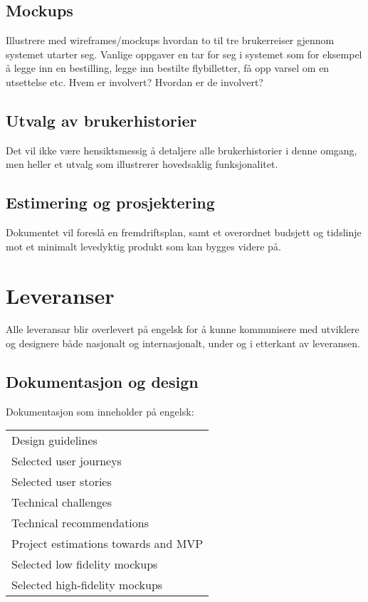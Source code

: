 \subsection{Mockups}
Illustrere med wireframes/mockups hvordan to til tre brukerreiser gjennom systemet utarter seg. Vanlige oppgaver en tar for seg i systemet som for eksempel å legge inn en bestilling, legge inn bestilte flybilletter, få opp varsel om en utsettelse etc. Hvem er involvert? Hvordan er de involvert?

\subsection{Utvalg av brukerhistorier}
Det vil ikke være hensiktsmessig å detaljere alle brukerhistorier i denne omgang, men heller et utvalg som illustrerer hovedsaklig funksjonalitet.

\subsection{Estimering og prosjektering}
Dokumentet vil foreslå en fremdriftsplan, samt et overordnet budsjett og tidslinje mot et minimalt levedyktig produkt som kan bygges videre på.

\section{Leveranser}
Alle leveransar blir overlevert på engelsk for å kunne kommunisere med utviklere og designere både nasjonalt og internasjonalt, under og i etterkant av leveransen.

\subsection{Dokumentasjon og design}
Dokumentasjon som inneholder på engelsk:

\begin{center}
\begin{tabu} to 1.0\textwidth {    X[l]  }
 \hline
Design guidelines \\
Selected user journeys \\
Selected user stories \\
Technical challenges \\
Technical recommendations \\
Project estimations towards and MVP \\
Selected low fidelity mockups \\
Selected high-fidelity mockups \\
 \hline
\end{tabu}
\end{center}


